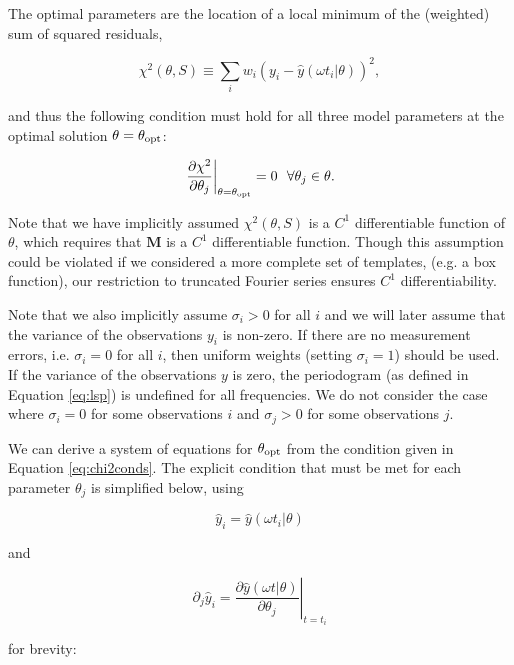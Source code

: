 \documentclass[apj]{emulateapj}
\begin{document}
The optimal parameters are the location of a local minimum of the (weighted) sum of
squared residuals,

\begin{equation}
    \chi^2(\theta, S) \equiv \sum_i w_i (y_i - \hat{y}(\omega t_i|\theta) )^2,
\end{equation}

\noindent and thus the following condition must hold for all three model parameters at
the optimal solution $\theta=\theta_{\rm opt}$:

\begin{equation}\label{eq:chi2conds}
    \left.\frac{\partial\chi^2}{\partial\theta_j}\right|_{\theta=\theta_{\rm opt}} = 0~~\forall\theta_j\in\theta.
\end{equation}

Note that we have implicitly assumed $\chi^2(\theta,S)$ is a $C^1$ differentiable
function of $\theta$, which requires that $\mathbf{M}$ is a
$C^1$ differentiable function. Though this assumption could be violated if we
considered a more complete set of templates, (e.g. a box function), our restriction
to truncated Fourier series ensures $C^1$ differentiability.

Note that we also implicitly assume $\sigma_i > 0$ for all $i$ and we will later
assume that the variance of the observations $y_i$ is non-zero. If there are no
measurement errors, i.e. $\sigma_i = 0$ for all $i$, then uniform weights
(setting $\sigma_i = 1$) should be used. If the variance of the observations $y$
is zero, the periodogram (as defined in Equation \ref{eq:lsp}) is undefined for all frequencies. We do not
consider the case where $\sigma_i = 0$ for some observations $i$ and $\sigma_j > 0$ for
some observations $j$.

We can derive a system of equations for $\theta_{\rm opt}$ from the condition given
in Equation \ref{eq:chi2conds}. The explicit condition that must be met for each parameter $\theta_j$ is simplified below,
using

\begin{equation}
\hat{y}_i = \hat{y}(\omega t_i | \theta)
\end{equation}

\noindent and

\begin{equation}
\partial_j\hat{y}_i = \left.\frac{\partial \hat{y}(\omega t|\theta)}{\partial \theta_j}\right|_{t = t_i}
\end{equation}

\noindent for brevity:
\end{document}
